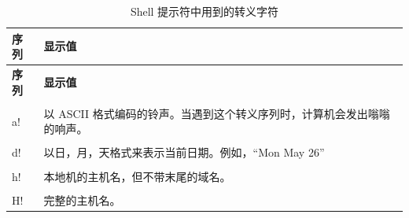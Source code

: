 \documentclass[doctor,openright,twoside]{sjtuthesis}
\newcommand{\passthrough}[1]{#1}
\theoremstyle{plain}
\theoremstyle{definition}
\theoremstyle{remark}
\theoremstyle{ocrenumbox}
\theoremstyle{plain}
\begin{document}
\begin{longtable}[]{@{}ll@{}}
\caption{Shell 提示符中用到的转义字符}\tabularnewline
\toprule
\begin{minipage}[b]{0.22\columnwidth}\raggedright
\textbf{序列}\strut
\end{minipage} & \begin{minipage}[b]{0.72\columnwidth}\raggedright
\textbf{显示值}\strut
\end{minipage}\tabularnewline
\midrule
\endfirsthead
\toprule
\begin{minipage}[b]{0.22\columnwidth}\raggedright
\textbf{序列}\strut
\end{minipage} & \begin{minipage}[b]{0.72\columnwidth}\raggedright
\textbf{显示值}\strut
\end{minipage}\tabularnewline
\midrule
\endhead
\begin{minipage}[t]{0.22\columnwidth}\raggedright
\passthrough{\lstinline!\\a!}\strut
\end{minipage} & \begin{minipage}[t]{0.72\columnwidth}\raggedright
以 ASCII
格式编码的铃声。当遇到这个转义序列时，计算机会发出嗡嗡的响声。\strut
\end{minipage}\tabularnewline
\begin{minipage}[t]{0.22\columnwidth}\raggedright
\passthrough{\lstinline!\\d!}\strut
\end{minipage} & \begin{minipage}[t]{0.72\columnwidth}\raggedright
以日，月，天格式来表示当前日期。例如，``Mon May 26''\strut
\end{minipage}\tabularnewline
\begin{minipage}[t]{0.22\columnwidth}\raggedright
\passthrough{\lstinline!\\h!}\strut
\end{minipage} & \begin{minipage}[t]{0.72\columnwidth}\raggedright
本地机的主机名，但不带末尾的域名。\strut
\end{minipage}\tabularnewline
\begin{minipage}[t]{0.22\columnwidth}\raggedright
\passthrough{\lstinline!\\H!}\strut
\end{minipage} & \begin{minipage}[t]{0.72\columnwidth}\raggedright
完整的主机名。\strut
\end{minipage}\tabularnewline

\end{longtable}
\end{document}

